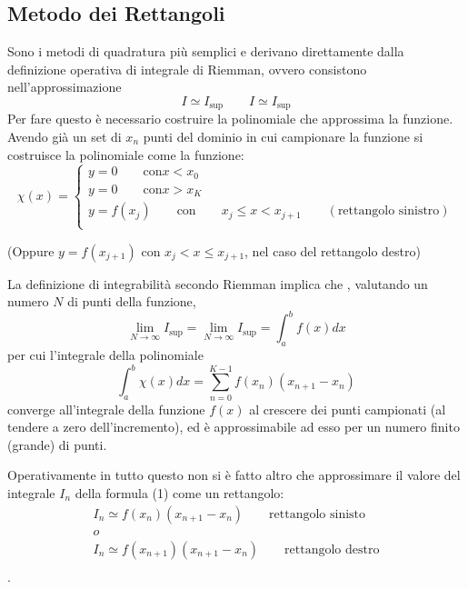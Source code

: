 \documentclass{article}
\begin{document}
\subsection{Metodo dei Rettangoli}
Sono i metodi di quadratura più semplici e derivano direttamente dalla definizione operativa di integrale di Riemman, ovvero consistono nell'approssimazione
$$I \simeq I_{\textrm{sup}} \qquad I \simeq I_{\textrm{sup}} $$
Per fare questo è necessario costruire la polinomiale che approssima la funzione.
Avendo già un set di ${x_{n}}$ punti del dominio in cui campionare la funzione si costruisce la polinomiale come la funzione:
\begin{equation}
	\chi(x) = \left\{ 
			\begin{array}{l}
 			y=0 \qquad \textrm{con} x < x_{0}\\
 			y=0 \qquad \textrm{con} x > x_{K} \\
			y= f(x_{j}) \qquad \textrm{con} \qquad x_{j} \leq x < x_{j+1} \qquad (\textrm{rettangolo sinistro}) \\
  			\end{array} \right.
	\end{equation}

(Oppure $ y= f(x_{j+1})$ con $ x_{j} < x \leq x_{j+1}$, nel caso del rettangolo destro)

La definizione di integrabilità secondo Riemman implica che , valutando un numero $N$ di punti della funzione,
$$  \lim_{N \rightarrow \infty}I_{\textrm{sup}}=\lim_{N \rightarrow \infty}I_{\textrm{sup}}=\int_{a}^{b}f(x)dx$$
per cui l'integrale della polinomiale
$$\int_{a}^{b}\chi(x)dx = \sum_{n=0}^{K-1}f(x_{n})(x_{n+1}-x_{n})$$
converge all'integrale della funzione $f(x)$ al crescere dei punti campionati (al tendere a zero dell'incremento), ed è approssimabile ad esso per un numero finito (grande) di punti.

Operativamente in tutto questo non si è fatto altro che approssimare il valore del integrale $I_{n}$ della formula (1) come un rettangolo:
\begin{equation}
			\begin{array}{l}
 			I_{n} \simeq  f(x_{n})(x_{n+1}-x_{n}) \qquad \textrm{rettangolo sinisto}\\
				o\\
 			I_{n} \simeq  f(x_{n+1})(x_{n+1}-x_{n}) \qquad \textrm{rettangolo destro}\\
			\end{array} 
	\end{equation}.
\end{document}

